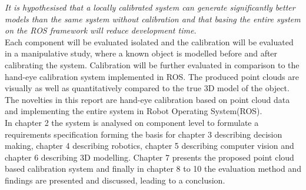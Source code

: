 \textit{It is hypothesised that a locally calibrated system can generate significantly better models than the same system without calibration and that basing the entire system on the ROS framework will reduce development time.} \\

Each component will be evaluated isolated and the calibration will be evaluated in a manipulative study, where a known object is modelled before and after calibrating the system. Calibration will be further evaluated in comparison to the hand-eye calibration system implemented in ROS. The produced point clouds are visually as well as quantitatively compared to the true 3D model of the object. The novelties in this report are hand-eye calibration based on point cloud data and implementing the entire system in Robot Operating System(ROS).\\

In chapter 2 the system is analysed on component level to formulate a requirements specification forming the basis for chapter 3 describing decision making, chapter 4 describing robotics, chapter 5 describing computer vision and chapter 6 describing 3D modelling. Chapter 7 presents the proposed point cloud based calibration system and finally in chapter 8 to 10 the evaluation method and findings are presented and discussed, leading to a conclusion.